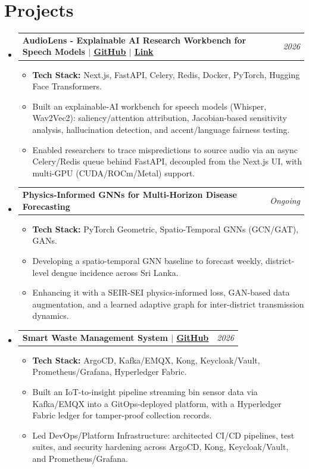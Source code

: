 \documentclass[a4paper,10pt]{article}
\makeatletter
\newcommand{\resumeItem}[1]{\item\small{#1}}
\newcommand{\resumeProjectHeading}[2]{
  \vspace{-1pt}\item
    \begin{tabular*}{0.97\textwidth}{l@{\extracolsep{\fill}}r}
      \textbf{#1} & \textit{\small #2} \\
    \end{tabular*}\vspace{-5pt}
}
\makeatother
\begin{document}
\section{Projects}
\begin{itemize}[leftmargin=0.15in, label={}]
    \resumeProjectHeading
      {AudioLens - Explainable AI Research Workbench for Speech Models  $|$ \href{https://github.com/ECHO-Lit/ECHO-LIT}{\underline{GitHub}} $|$ \href{https://audiolens-xi.vercel.app/}{\underline{Link}}}{2026}
      \begin{itemize}[leftmargin=0.15in, label={\tiny$\bullet$}]
        \resumeItem{\textbf{Tech Stack:} Next.js, FastAPI, Celery, Redis, Docker, PyTorch, Hugging Face Transformers.}
        \resumeItem{Built an explainable-AI workbench for speech models (Whisper, Wav2Vec2): saliency/attention attribution, Jacobian-based sensitivity analysis, hallucination detection, and accent/language fairness testing.}
        \resumeItem{Enabled researchers to trace mispredictions to source audio via an async Celery/Redis queue behind FastAPI, decoupled from the Next.js UI, with multi-GPU (CUDA/ROCm/Metal) support.}
      \end{itemize}
    \resumeProjectHeading
      {Physics-Informed GNNs for Multi-Horizon Disease Forecasting}{Ongoing}
      \begin{itemize}[leftmargin=0.15in, label={\tiny$\bullet$}]
        \resumeItem{\textbf{Tech Stack:} PyTorch Geometric, Spatio-Temporal GNNs (GCN/GAT), GANs.}
        \resumeItem{Developing a spatio-temporal GNN baseline to forecast weekly, district-level dengue incidence across Sri Lanka.}
        \resumeItem{Enhancing it with a SEIR-SEI physics-informed loss, GAN-based data augmentation, and a learned adaptive graph for inter-district transmission dynamics.}
      \end{itemize}
    \resumeProjectHeading
      {Smart Waste Management System  $|$ \href{https://github.com/UOM-CSE-Sem4-GroupF}{\underline{GitHub}}}{2026}
      \begin{itemize}[leftmargin=0.15in, label={\tiny$\bullet$}]
        \resumeItem{\textbf{Tech Stack:} ArgoCD, Kafka/EMQX, Kong, Keycloak/Vault, Prometheus/Grafana, Hyperledger Fabric.}
        \resumeItem{Built an IoT-to-insight pipeline streaming bin sensor data via Kafka/EMQX into a GitOps-deployed platform, with a Hyperledger Fabric ledger for tamper-proof collection records.}
        \resumeItem{Led DevOps/Platform Infrastructure: architected CI/CD pipelines, test suites, and security hardening across ArgoCD, Kong, Keycloak/Vault, and Prometheus/Grafana.}

\end{itemize}
\end{itemize}
\end{document}
